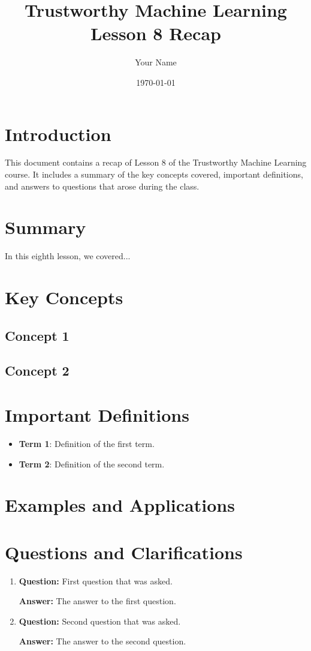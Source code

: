\documentclass[11pt,a4paper]{article}
\title{Trustworthy Machine Learning\\
\large Lesson 8 Recap}
\author{Your Name}
\date{\today}
\newcommand{\concept}[1]{\textbf{#1}}
\begin{document}
\maketitle
\tableofcontents
\newpage

\section{Introduction}
This document contains a recap of Lesson 8 of the Trustworthy Machine Learning course. It includes a summary of the key concepts covered, important definitions, and answers to questions that arose during the class.

\section{Summary}
In this eighth lesson, we covered...

\section{Key Concepts}
\subsection{Concept 1}

\subsection{Concept 2}

\section{Important Definitions}
\begin{itemize}
    \item \concept{Term 1}: Definition of the first term.
    \item \concept{Term 2}: Definition of the second term.
\end{itemize}

\section{Examples and Applications}

\section{Questions and Clarifications}
\begin{enumerate}
    \item \textbf{Question:} First question that was asked.
    
    \textbf{Answer:} The answer to the first question.
    
    \item \textbf{Question:} Second question that was asked.
    
    \textbf{Answer:} The answer to the second question.
\end{enumerate}
\end{document}
